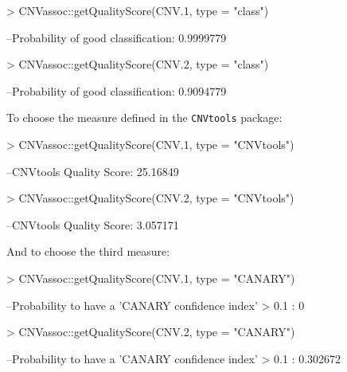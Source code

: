 \documentclass[11pt]{article}
\begin{document}
\begin{Schunk}
\begin{Sinput}
> CNVassoc::getQualityScore(CNV.1, type = "class")
\end{Sinput}
\begin{Soutput}
--Probability of good classification: 0.9999779 
\end{Soutput}
\begin{Sinput}
> CNVassoc::getQualityScore(CNV.2, type = "class")
\end{Sinput}
\begin{Soutput}
--Probability of good classification: 0.9094779 
\end{Soutput}
\end{Schunk}

%
To choose the measure defined in the \texttt{CNVtools} package:
%

\begin{Schunk}
\begin{Sinput}
> CNVassoc::getQualityScore(CNV.1, type = "CNVtools")
\end{Sinput}
\begin{Soutput}
--CNVtools Quality Score: 25.16849 
\end{Soutput}
\begin{Sinput}
> CNVassoc::getQualityScore(CNV.2, type = "CNVtools")
\end{Sinput}
\begin{Soutput}
--CNVtools Quality Score: 3.057171 
\end{Soutput}
\end{Schunk}

%
And to choose the third measure:
%

\begin{Schunk}
\begin{Sinput}
> CNVassoc::getQualityScore(CNV.1, type = "CANARY")
\end{Sinput}
\begin{Soutput}
--Probability to have a 'CANARY confidence index' > 0.1 : 0 
\end{Soutput}
\begin{Sinput}
> CNVassoc::getQualityScore(CNV.2, type = "CANARY")
\end{Sinput}
\begin{Soutput}
--Probability to have a 'CANARY confidence index' > 0.1 : 0.302672 
\end{Soutput}
\end{Schunk}
\end{document}
